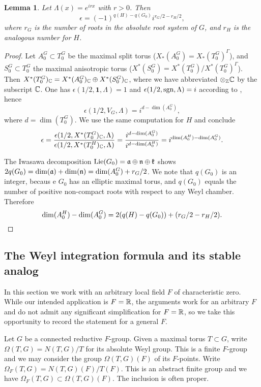 \documentclass{article}
\newtheorem{lem}[thm]{Lemma}
\theoremstyle{definition}
\numberwithin{equation}{section}
\renewcommand{\-}{\hyp{}}
\begin{document}
\begin{lem} \label{lem:epsilon}
Let $\Lambda(x)=e^{irx}$ with $r>0$. Then
\[ \epsilon = (-1)^{q(H)-q(G_0)}i^{r_G/2-r_H/2}, \]
where $r_G$ is the number of roots in the absolute root system of $G$, and $r_H$ is the analogous number for $H$.
\end{lem}
\begin{proof}
Let $A_0^G \subset T_0^G$ be the maximal split torus ($X_*(A_0^G)=X_*(T_0^G)^\Gamma$), and $S_0^G \subset T_0^G$ the maximal anisotropic torus ($X^*(S_0^G)=X^*(T_0^G)/X^*(T_0^G)^\Gamma$). Then $X^*(T_0^G)_{\mathbb{C}}=X^*(A_0^G)_{\mathbb{C}} \oplus X^*(S_0^G)_{\mathbb{C}}$, where we have abbreviated $\otimes_{\mathbb{Z}}\mathbb{C}$ by the subscript $\mathbb{C}$. One has $\epsilon(1/2,\textbf{1},\Lambda)=1$ and $\epsilon(1/2,\textrm{sgn},\Lambda)=i$ according to \cite[(3.2.4)]{TateCor}, hence
\[ \epsilon(1/2,V_G,\Lambda)=i^{d-\dim(A_0^G)}, \]
where $d=\dim(T_0^G)$. We use the same computation for $H$ and conclude
\[ \epsilon=\frac{\epsilon(1/2,X^*(T_0^G)_{\mathbb{C}},\Lambda)}{\epsilon(1/2,X^*(T_0^H)_{\mathbb{C}},\Lambda)} = \frac{i^{d-\dim(A_0^G)}}{i^{d-\dim(A_0^H)}}=i^{\dim(A_0^H)-\dim(A_0^G)}. \]

The Iwasawa decomposition $\textrm{Lie}(G_0)=\mathfrak{a} \oplus\mathfrak{n} \oplus \mathfrak{k}$ shows  $2q(G_0)=\dim(\mathfrak{a})+\dim(\mathfrak{n})=\dim(A_0^G)+r_G/2$. We note that $q(G_0)$ is an integer, becaus e $G_0$ has an elliptic maximal torus, and $q(G_0)$ equals the number of positive non-compact roots with respect to any Weyl chamber. Therefore
\[ \dim(A_0^H)-\dim(A_0^G) = 2(q(H)-q(G_0))+(r_G/2-r_H/2).\qedhere \]
\end{proof}


\subsection{The Weyl integration formula and its stable analog} \label{sub:weylint}

In this section we work with an arbitrary local field $F$ of characteristic zero. While our intended application is $F=\mathbb{R}$, the arguments work for an arbitrary $F$ and do not admit any significant simplification for $F=\mathbb{R}$, so we take this opportunity to record the statement for a general $F$. 

Let $G$ be a connected reductive $F$-group. Given a maximal torus $T \subset G$, write $\Omega(T,G)=N(T,G)/T$ for its absolute Weyl group. This is a finite $F$-group and we may consider the group $\Omega(T,G)(F)$ of its $F$-points. Write $\Omega_F(T,G)=N(T,G)(F)/T(F)$. This is an abstract finite group and we have $\Omega_F(T,G) \subset \Omega(T,G)(F)$. The inclusion is often proper.
\end{document}
